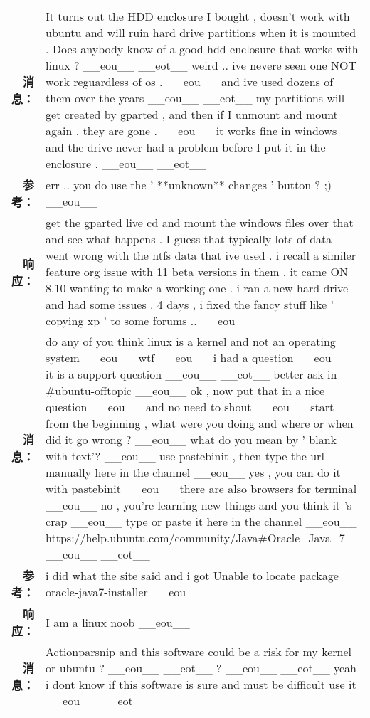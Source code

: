 \begin{tabularx}{\textwidth}{@{}rX@{}}%
\toprule%
\midrule%
\textbf{消息：}&It turns out the HDD enclosure I bought , doesn't work with ubuntu and will ruin hard drive partitions when it is mounted . Does anybody know of a good hdd enclosure that works with linux ? \_\_eou\_\_ \_\_eot\_\_ weird .. ive nevere seen one NOT work reguardless of os . \_\_eou\_\_ and ive used dozens of them over the years \_\_eou\_\_ \_\_eot\_\_ my partitions will get created by gparted , and then if I unmount and mount again , they are gone . \_\_eou\_\_ it works fine in windows and the drive never had a problem before I put it in the enclosure . \_\_eou\_\_ \_\_eot\_\_\\%
\textbf{参考：}&err .. you do use the ' **unknown** changes ' button ? ;) \_\_eou\_\_\\%
\textbf{响应：}&get the gparted live cd and mount the windows files over that and see what happens . I guess that typically lots of data went wrong with the ntfs data that ive used . i recall a similer feature org issue with 11 beta versions in them . it came ON 8.10 wanting to make a working one . i ran a new hard drive and had some issues . 4 days , i fixed the fancy stuff like ' copying xp ' to some forums .. \_\_eou\_\_\\%
\midrule%
\textbf{消息：}&do any of you think linux is a kernel and not an operating system \_\_eou\_\_ wtf \_\_eou\_\_ i had a question \_\_eou\_\_ it is a support question \_\_eou\_\_ \_\_eot\_\_ better ask in \#ubuntu{-}offtopic \_\_eou\_\_ ok , now put that in a nice question \_\_eou\_\_ and no need to shout \_\_eou\_\_ start from the beginning , what were you doing and where or when did it go wrong ? \_\_eou\_\_ what do you mean by ' blank with text'? \_\_eou\_\_ use pastebinit , then type the url manually here in the channel \_\_eou\_\_ yes , you can do it with pastebinit \_\_eou\_\_ there are also browsers for terminal \_\_eou\_\_ no , you're learning new things and you think it 's crap \_\_eou\_\_ type or paste it here in the channel \_\_eou\_\_ https://help.ubuntu.com/community/Java\#Oracle\_Java\_7 \_\_eou\_\_ \_\_eot\_\_\\%
\textbf{参考：}&i did what the site said and i got Unable to locate package oracle{-}java7{-}installer \_\_eou\_\_\\%
\textbf{响应：}&I am a linux noob \_\_eou\_\_\\%
\midrule%
\textbf{消息：}&Actionparsnip and this software could be a risk for my kernel or ubuntu ? \_\_eou\_\_ \_\_eot\_\_ ? \_\_eou\_\_ \_\_eot\_\_ yeah i dont know if this software is sure and must be difficult use it \_\_eou\_\_ \_\_eot\_\_\\%

\end{tabularx}
